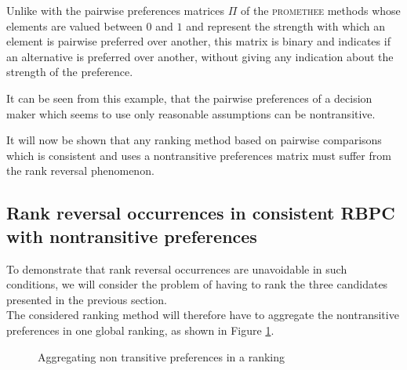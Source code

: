 Unlike with the pairwise preferences matrices $\Pi$ of the \textsc{promethee} methods whose elements are valued between $0$ and $1$ and represent the strength with which an element is pairwise preferred over another, this matrix is binary and indicates if an alternative is preferred over another, without giving any indication about the strength of the preference.

It can be seen from this example, that the pairwise preferences of a decision maker which seems to use only reasonable assumptions can be nontransitive.

It will now be shown that any ranking method based on pairwise comparisons which is consistent and uses a nontransitive preferences matrix must suffer from the rank reversal phenomenon.

\subsection{Rank reversal occurrences in consistent RBPC with nontransitive preferences}

To demonstrate that rank reversal occurrences are unavoidable in such conditions, we will consider the problem of having to rank the three candidates presented in the previous section. \\
The considered ranking method will therefore have to aggregate the nontransitive preferences in one global ranking, as shown in Figure \ref{fig:aggregating_nontrans}.
\vskip 0.15cm

\begin{figure}[h]
    \centering
    \caption{Aggregating non transitive preferences in a ranking} \label{fig:aggregating_nontrans}
\end{figure}


